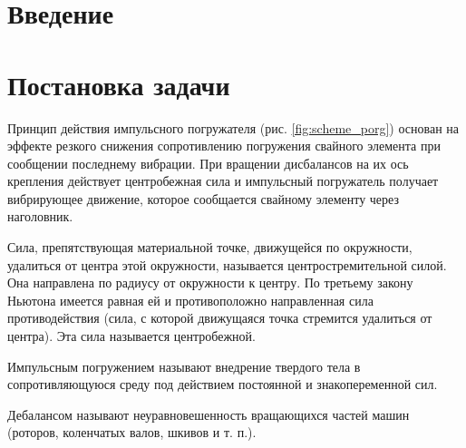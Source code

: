 \section*{Введение}


\clearpage
\section{Постановка задачи}

Принцип действия импульсного погружателя (рис. \ref{fig:scheme_porg}) основан на эффекте резкого снижения сопротивлению погружения свайного элемента при сообщении последнему вибрации. При вращении дисбалансов на их ось крепления действует центробежная сила и импульсный погружатель получает вибрирующее движение, которое сообщается свайному элементу через наголовник.

\begin{definition}
    Сила, препятствующая материальной точке, движущейся по окружности, удалиться от центра этой окружности, называется центростремительной силой. Она направлена по радиусу от окружности к центру. По третьему закону Ньютона имеется равная ей и противоположно направленная сила противодействия (сила, с которой движущаяся точка стремится удалиться от центра). Эта сила называется центробежной.
\end{definition}

\begin{definition}
    Импульсным погружением называют внедрение твердого тела в сопротивляющуюся среду под действием постоянной и знакопеременной сил.
\end{definition}


\begin{definition}
    Дебалансом называют неуравновешенность вращающихся частей машин (роторов, коленчатых валов, шкивов и т. п.).
\end{definition}

